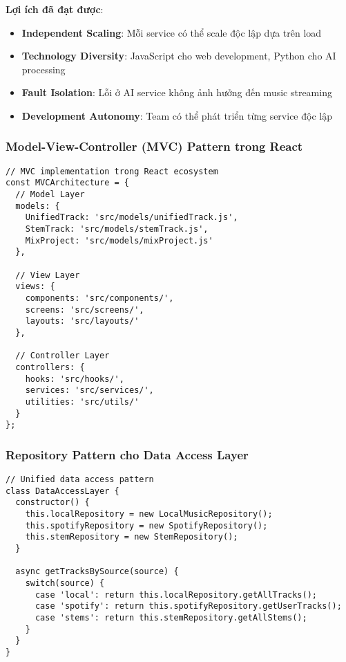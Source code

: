 \documentclass[12pt,a4paper]{article}
\begin{document}
\textbf{Lợi ích đã đạt được}:
\begin{itemize}
\item \textbf{Independent Scaling}: Mỗi service có thể scale độc lập dựa trên load
\item \textbf{Technology Diversity}: JavaScript cho web development, Python cho AI processing
\item \textbf{Fault Isolation}: Lỗi ở AI service không ảnh hưởng đến music streaming
\item \textbf{Development Autonomy}: Team có thể phát triển từng service độc lập
\end{itemize}

\subsubsection{Model-View-Controller (MVC) Pattern trong React}

\begin{lstlisting}[caption={MVC implementation trong React ecosystem}]
// MVC implementation trong React ecosystem
const MVCArchitecture = {
  // Model Layer
  models: {
    UnifiedTrack: 'src/models/unifiedTrack.js',
    StemTrack: 'src/models/stemTrack.js',
    MixProject: 'src/models/mixProject.js'
  },
  
  // View Layer
  views: {
    components: 'src/components/',
    screens: 'src/screens/',
    layouts: 'src/layouts/'
  },
  
  // Controller Layer
  controllers: {
    hooks: 'src/hooks/',
    services: 'src/services/',
    utilities: 'src/utils/'
  }
};
\end{lstlisting}

\subsubsection{Repository Pattern cho Data Access Layer}

\begin{lstlisting}[caption={Unified data access pattern}]
// Unified data access pattern
class DataAccessLayer {
  constructor() {
    this.localRepository = new LocalMusicRepository();
    this.spotifyRepository = new SpotifyRepository();
    this.stemRepository = new StemRepository();
  }
  
  async getTracksBySource(source) {
    switch(source) {
      case 'local': return this.localRepository.getAllTracks();
      case 'spotify': return this.spotifyRepository.getUserTracks();
      case 'stems': return this.stemRepository.getAllStems();
    }
  }
}
\end{lstlisting}
\end{document}
